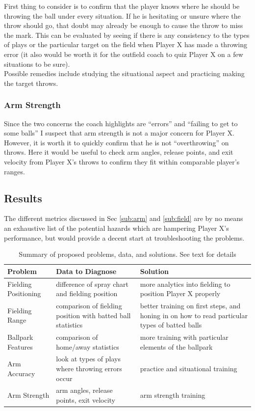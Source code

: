 \documentclass[paper=a4, fontsize=11pt]{scrartcl} %
\begin{document}
First thing to consider is to confirm that the player knows where he should be throwing the ball under every situation. If he is hesitating or unsure where the throw should go, that doubt may already be enough to cause the throw to miss the mark. This can be evaluated by seeing if there is any consistency to the types of plays or the particular target on the field when Player X has made a throwing error (it also would be worth it for the outfield coach to quiz Player X on a few situations to be sure). 
\\

Possible remedies include studying the situational aspect and practicing making the target throws.

\subsubsection{Arm Strength}

Since the two concerns the coach highlights are ``errors'' and ``failing to get to some balls'' I suspect that arm strength is not a major concern for Player X. However, it is worth it to quickly confirm that he is not ``overthrowing'' on throws. Here it would be useful to check arm angles, release points, and exit velocity from Player X's throws to confirm they fit within comparable player's ranges.
\subsection{Results}

The different metrics discussed in Sec \ref{sub:arm} and \ref{sub:field} are by no means an exhaustive list of the potential hazards which are hampering Player X's performance, but would provide a decent start at troubleshooting the problems. 

\begin{table}
\begin{center}
\begin{tabularx}{\textwidth}{ |X|X|X| }
 \hline
 Problem & Data to Diagnose & Solution \\ [0.5ex] 
 \hline
 \hline
 Fielding Positioning & difference of spray chart and fielding position & more analytics into fielding to position Player X properly\\
\hline
 Fielding Range & comparison of fielding position with batted ball statistics & better training on first steps, and honing in on how to read particular types of batted balls \\
\hline
 Ballpark Features & comparison of home/away statistics & more training with particular elements of the ballpark\\
\hline
 Arm Accuracy & look at types of plays where throwing errors occur & practice and situational training\\
\hline
 Arm Strength & arm angles, release points, exit velocity & arm strength training \\

 \hline
\end{tabularx} \label{tab:of}
\end{center}
\caption{Summary of proposed problems, data, and solutions. See text for details}
\end{table}
\end{document}
